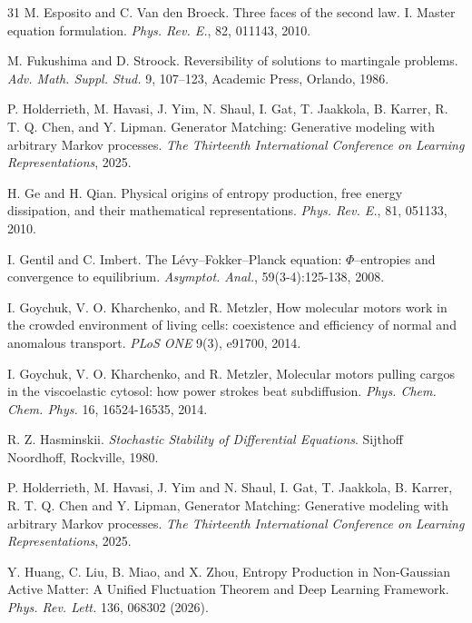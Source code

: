 \documentclass[10pt]{article}
\theoremstyle{definition}
\numberwithin{equation}{section}
\begin{document}
\begin{thebibliography}{31}
 M. Esposito and C. Van den Broeck. Three faces of the second law. I. Master equation formulation. {\it Phys. Rev. E.}, 82, 011143, 2010.


 M. Fukushima and D. Stroock. Reversibility of solutions to martingale problems. {\it Adv. Math. Suppl. Stud.} 9, 107--123, Academic Press, Orlando, 1986.

 P. Holderrieth, M. Havasi, J. Yim, N. Shaul, I. Gat, T. Jaakkola, B. Karrer, R. T. Q. Chen, and Y. Lipman. Generator Matching: Generative modeling with arbitrary Markov processes. {\it The Thirteenth International Conference on Learning Representations}, 2025.

 H. Ge and H. Qian. Physical origins of entropy production, free energy dissipation, and their mathematical representations. {\it Phys. Rev. E.}, 81, 051133, 2010.

 I. Gentil and C. Imbert. The L\'{e}vy--Fokker--Planck equation: $\Phi$--entropies and convergence to equilibrium. \textit{Asymptot. Anal.}, 59(3-4):125-138, 2008.

I. Goychuk, V. O. Kharchenko, and R. Metzler,
How molecular motors work in the crowded environment of living cells: coexistence and efficiency of normal and anomalous transport.
\textit{PLoS ONE} 9(3), e91700, 2014.

I. Goychuk, V. O. Kharchenko, and R. Metzler,
Molecular motors pulling cargos in the viscoelastic cytosol: how power strokes beat subdiffusion.
\textit{Phys. Chem. Chem. Phys.} 16, 16524-16535, 2014.

 R. Z. Hasminskii. {\it Stochastic Stability of Differential Equations}. Sijthoff  Noordhoff, Rockville, 1980.

P. Holderrieth, M. Havasi, J. Yim and N. Shaul, I. Gat, T. Jaakkola, B. Karrer, R. T. Q. Chen and Y. Lipman,
Generator Matching: Generative modeling with arbitrary Markov processes.
\textit{The Thirteenth International Conference on Learning Representations}, 2025.

Y. Huang, C. Liu, B. Miao, and X. Zhou,
Entropy Production in Non-Gaussian Active Matter: A Unified Fluctuation Theorem and Deep Learning Framework.
\textit{Phys. Rev. Lett.} 136, 068302 (2026).



\end{thebibliography}
\end{document}
